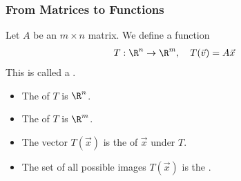 \begin{frame}
\frametitle{From Matrices to Functions}

Let $A$ be an $m \times n$ matrix. We define a function
\begin{align*}
T: \R^n &\to \R^m, \quad T(\vec v) = A \vec x
\end{align*}
This is called a .

\begin{itemize}
    \item The  of $T$ is $\R^n$.

    \item The  of $T$ is $\R^m$.

    \item The vector $T(\vec x)$ is the  of $\vec x$ under $T$.
    
    \item The set of all possible images $T(\vec x)$ is the .

\end{itemize}


\end{frame}

